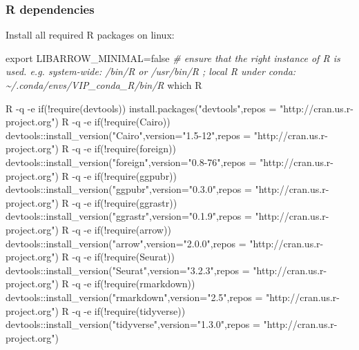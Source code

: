 \documentclass[
]{article}
\newenvironment{Shaded}{\begin{snugshade}}{\end{snugshade}}
\newcommand{\AttributeTok}[1]{\textcolor[rgb]{0.77,0.63,0.00}{#1}}
\newcommand{\BuiltInTok}[1]{#1}
\newcommand{\CommentTok}[1]{\textcolor[rgb]{0.56,0.35,0.01}{\textit{#1}}}
\newcommand{\ExtensionTok}[1]{#1}
\newcommand{\FunctionTok}[1]{\textcolor[rgb]{0.00,0.00,0.00}{#1}}
\newcommand{\NormalTok}[1]{#1}
\newcommand{\StringTok}[1]{\textcolor[rgb]{0.31,0.60,0.02}{#1}}
\newcommand{\VariableTok}[1]{\textcolor[rgb]{0.00,0.00,0.00}{#1}}
\begin{document}
\hypertarget{r-dependencies}{%
\subsubsection{R dependencies}\label{r-dependencies}}

Install all required R packages on linux:

\begin{Shaded}
\begin{Highlighting}[]
\BuiltInTok{export} \VariableTok{LIBARROW\_MINIMAL=}\NormalTok{false}
\CommentTok{\#  ensure that the right instance of R is used. e.g. system{-}wide: /bin/R or /usr/bin/R ; local R under conda: \textasciitilde{}/.conda/envs/VIP\_conda\_R/bin/R}
\FunctionTok{which}\NormalTok{ R}

\ExtensionTok{R} \AttributeTok{{-}q} \AttributeTok{{-}e} \StringTok{\textquotesingle{}if(!require(devtools)) install.packages("devtools",repos = "http://cran.us.r{-}project.org")\textquotesingle{}}
\ExtensionTok{R} \AttributeTok{{-}q} \AttributeTok{{-}e} \StringTok{\textquotesingle{}if(!require(Cairo)) devtools::install\_version("Cairo",version="1.5{-}12",repos = "http://cran.us.r{-}project.org")\textquotesingle{}}
\ExtensionTok{R} \AttributeTok{{-}q} \AttributeTok{{-}e} \StringTok{\textquotesingle{}if(!require(foreign)) devtools::install\_version("foreign",version="0.8{-}76",repos = "http://cran.us.r{-}project.org")\textquotesingle{}}
\ExtensionTok{R} \AttributeTok{{-}q} \AttributeTok{{-}e} \StringTok{\textquotesingle{}if(!require(ggpubr)) devtools::install\_version("ggpubr",version="0.3.0",repos = "http://cran.us.r{-}project.org")\textquotesingle{}}
\ExtensionTok{R} \AttributeTok{{-}q} \AttributeTok{{-}e} \StringTok{\textquotesingle{}if(!require(ggrastr)) devtools::install\_version("ggrastr",version="0.1.9",repos = "http://cran.us.r{-}project.org")\textquotesingle{}}
\ExtensionTok{R} \AttributeTok{{-}q} \AttributeTok{{-}e} \StringTok{\textquotesingle{}if(!require(arrow)) devtools::install\_version("arrow",version="2.0.0",repos = "http://cran.us.r{-}project.org")\textquotesingle{}}
\ExtensionTok{R} \AttributeTok{{-}q} \AttributeTok{{-}e} \StringTok{\textquotesingle{}if(!require(Seurat)) devtools::install\_version("Seurat",version="3.2.3",repos = "http://cran.us.r{-}project.org")\textquotesingle{}}
\ExtensionTok{R} \AttributeTok{{-}q} \AttributeTok{{-}e} \StringTok{\textquotesingle{}if(!require(rmarkdown)) devtools::install\_version("rmarkdown",version="2.5",repos = "http://cran.us.r{-}project.org")\textquotesingle{}}
\ExtensionTok{R} \AttributeTok{{-}q} \AttributeTok{{-}e} \StringTok{\textquotesingle{}if(!require(tidyverse)) devtools::install\_version("tidyverse",version="1.3.0",repos = "http://cran.us.r{-}project.org")\textquotesingle{}}

\end{Highlighting}
\end{Shaded}
\end{document}
